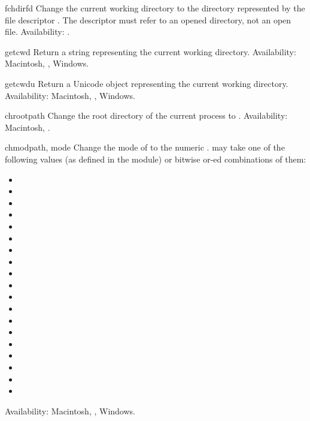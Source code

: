 \begin{funcdesc}{fchdir}{fd}
Change the current working directory to the directory represented by
the file descriptor .  The descriptor must refer to an opened
directory, not an open file.
Availability: \UNIX.
\end{funcdesc}

\begin{funcdesc}{getcwd}{}
Return a string representing the current working directory.
Availability: Macintosh, \UNIX, Windows.
\end{funcdesc}

\begin{funcdesc}{getcwdu}{}
Return a Unicode object representing the current working directory.
Availability: Macintosh, \UNIX, Windows.
\end{funcdesc}

\begin{funcdesc}{chroot}{path}
Change the root directory of the current process to .
Availability: Macintosh, \UNIX.
\end{funcdesc}

\begin{funcdesc}{chmod}{path, mode}
Change the mode of  to the numeric .
 may take one of the following values
(as defined in the  module) or bitwise or-ed
combinations of them:
\begin{itemize}
  \item {}
  \item {}
  \item {}
  \item {}
  \item {}
  \item {}
  \item {}
  \item {}
  \item {}
  \item {}
  \item {}
  \item {}
  \item {}
  \item {}
  \item {}
  \item {}
  \item {}
  \item {}
  \item {}
\end{itemize}
Availability: Macintosh, \UNIX, Windows.

\end{funcdesc}

